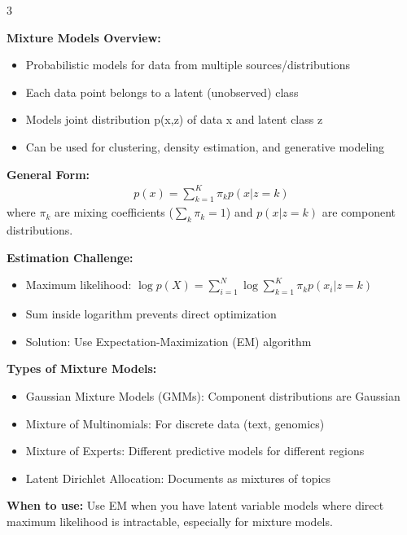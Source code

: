 \documentclass[10pt,landscape]{article}
\begin{document}
\begin{multicols}{3}
\begin{tcolorbox}[breakable, title=6. Mixture Models Concepts, colback=mixture]
\textbf{Mixture Models Overview:}
\begin{itemize}[leftmargin=*,noitemsep,topsep=0pt]
    \item Probabilistic models for data from multiple sources/distributions
    \item Each data point belongs to a latent (unobserved) class
    \item Models joint distribution p(x,z) of data x and latent class z
    \item Can be used for clustering, density estimation, and generative modeling
\end{itemize}

\textbf{General Form:}
\begin{align}
p(x) = \sum_{k=1}^K \pi_k p(x|z=k)
\end{align}
where $\pi_k$ are mixing coefficients ($\sum_k \pi_k = 1$) and $p(x|z=k)$ are component distributions.

\textbf{Estimation Challenge:}
\begin{itemize}[leftmargin=*,noitemsep,topsep=0pt]
    \item Maximum likelihood: $\log p(X) = \sum_{i=1}^N \log \sum_{k=1}^K \pi_k p(x_i|z=k)$
    \item Sum inside logarithm prevents direct optimization
    \item Solution: Use Expectation-Maximization (EM) algorithm
\end{itemize}

\textbf{Types of Mixture Models:}
\begin{itemize}[leftmargin=*,noitemsep,topsep=0pt]
    \item Gaussian Mixture Models (GMMs): Component distributions are Gaussian
    \item Mixture of Multinomials: For discrete data (text, genomics)
    \item Mixture of Experts: Different predictive models for different regions
    \item Latent Dirichlet Allocation: Documents as mixtures of topics
\end{itemize}
\end{tcolorbox}

\begin{tcolorbox}[breakable, title=6.1 Expectation-Maximization (EM) Algorithm, colback=mixture]
\textbf{When to use:} Use EM when you have latent variable models where direct maximum likelihood is intractable, especially for mixture models.


\end{tcolorbox}
\end{multicols}
\end{document}
